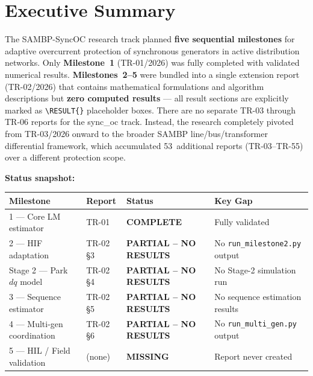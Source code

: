 \documentclass[12pt,a4paper]{article}
\newcommand{\statusComplete}{\textcolor{completedGreen}{\textbf{COMPLETE}}}
\newcommand{\statusPartial}{\textcolor{partialOrange}{\textbf{PARTIAL -- NO RESULTS}}}
\newcommand{\statusMissing}{\textcolor{missingRed}{\textbf{MISSING}}}
\begin{document}
\newpage
\tableofcontents
\newpage

\section{Executive Summary}
\label{sec:exec}

\begin{warningbox}[title={Critical Finding}]
The SAMBP-SyncOC research track planned \textbf{five sequential milestones} for
adaptive overcurrent protection of synchronous generators in active distribution
networks.  Only \textbf{Milestone~1} (TR-01/2026) was fully completed with validated
numerical results.  \textbf{Milestones~2--5} were bundled into a single extension report
(TR-02/2026) that contains mathematical formulations and algorithm descriptions
but \textbf{zero computed results} --- all result sections are explicitly marked as
\texttt{\textbackslash RESULT\{\}} placeholder boxes.  There are no separate TR-03
through TR-06 reports for the sync\_oc track.  Instead, the research completely
pivoted from TR-03/2026 onward to the broader SAMBP line/bus/transformer
differential framework, which accumulated 53~additional reports (TR-03--TR-55)
over a different protection scope.
\end{warningbox}

\medskip
\noindent\textbf{Status snapshot:}

\begin{center}
\begin{tabular}{lllp{6.5cm}}
\toprule
\textbf{Milestone} & \textbf{Report} & \textbf{Status} & \textbf{Key Gap} \\
\midrule
1 — Core LM estimator        & TR-01 & \statusComplete & Fully validated \\
2 — HIF adaptation           & TR-02 \S3 & \statusPartial & No \texttt{run\_milestone2.py} output \\
Stage 2 — Park $dq$ model    & TR-02 \S4 & \statusPartial & No Stage-2 simulation run \\
3 — Sequence estimator       & TR-02 \S5 & \statusPartial & No sequence estimation results \\
4 — Multi-gen coordination   & TR-02 \S6 & \statusPartial & No \texttt{run\_multi\_gen.py} output \\
5 — HIL / Field validation   & (none)   & \statusMissing & Report never created \\
\bottomrule
\end{tabular}
\end{center}
\end{document}
